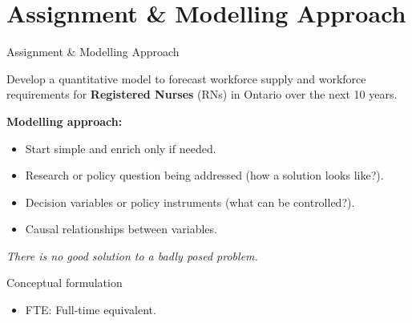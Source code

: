\documentclass[aspectratio=169, 10pt]{beamer}
\begin{document}
\section{Assignment \& Modelling Approach}
\begin{frame}{Assignment \& Modelling Approach}
    \begin{block}{Develop a quantitative model to forecast workforce supply and workforce requirements for \textbf{Registered Nurses} (RNs) in Ontario over the next 10 years.}
    \end{block}
    \vspace{0.5cm}
    \textbf{Modelling approach:}
    \begin{itemize}
        \item Start simple and enrich only if needed.
        \item Research or policy question being addressed (how a solution looks like?).
        \item Decision variables or policy instruments (what can be controlled?).
        \item Causal relationships between variables.
    \end{itemize}
    \vspace{0.2cm}
    \begin{center}
        \emph{There is no good solution to a badly posed problem.}
    \end{center}  
\end{frame}


\begin{frame}{Conceptual formulation}
    \centering
    \vspace{0.3cm}
    \begin{itemize}
        \item FTE: Full-time equivalent.
    \end{itemize}
\end{frame}
\end{document}
